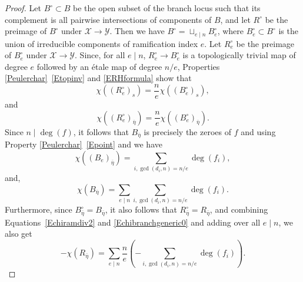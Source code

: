 \documentclass[12pt]{amsart}
\numberwithin{equation}{section}
\theoremstyle{definition}
\newcommand{\padma}[1]{{\color{Magenta} \sf $\clubsuit\clubsuit\clubsuit$ Padma: [#1]}}
\newcommand{\mc}[1]{\mathcal{#1}}
\begin{document}
\begin{proof}
 Let $B^\circ \subset B$ be the open subset of the branch locus such
 that its complement is all pairwise intersections of components of
 $B$, and let $R^\circ$ be the preimage of $B^\circ$ under $\mc{X}
 \rightarrow \mc{Y}$. Then we have $B^\circ = \sqcup_{e \mid n}
 B^\circ_e$, where $B^\circ_e \subset B^\circ$ is the union of
 irreducible components of ramification index $e$. Let $R^\circ_e$ be
 the preimage of $B^\circ_e$ under $\mc{X} \rightarrow \mc{Y}$.
 Since, for all $e \mid n$,
 $R^{\circ}_e \to B^{\circ}_e$ is a topologically trivial map of
 degree $e$ followed by an \'{e}tale map of degree $n/e$, Properties \ref{Peulerchar}~\ref{Etopinv} and
 \ref{ERHformula} show that
 \begin{equation}\label{Echiramdiv1}
  \chi((R^\circ_e)_s) = \frac{n}{e} \chi((B^\circ_e)_s), \end{equation} and
  \begin{equation}\label{Echiramdiv2} \chi((R^\circ_e)_{\overline{\eta}}) = \frac{n}{e} \chi((B^\circ_e)_{\overline{\eta}}).
 \end{equation}
Since $n \mid \deg(f)$, it follows that $B_{\overline{\eta}}$ is
precisely the zeroes of $f$ and using Property
\ref{Peulerchar}~\ref{Epoint} and  we have 
\begin{equation}\label{Echibranchgeneric0}  
\chi((B_e)_{\overline{\eta}}) = \sum_{i,\gcd(d_i,n) = n/e} \deg(f_i), \end{equation} and, 
\begin{equation}\label{Echibranchgeneric}  
\chi(B_{\overline{\eta}}) = \sum_{e \mid n} \sum_{i,\gcd(d_i,n) = n/e} \deg(f_i). \end{equation}
Furthermore, since $B^\circ_{\overline{\eta}} = B_{\overline{\eta}}$, it also follows that $R^\circ_{\overline{\eta}} = R_{\overline{\eta}}$, and combining Equations~\eqref{Echiramdiv2} and \eqref{Echibranchgeneric0} and adding over all $e \mid n$, we also get
\begin{equation}\label{Echiramdiv3}
 -\chi(R_{\overline{\eta}}) = \sum_{e \mid n} \frac{n}{e}\left(-\sum_{i,\gcd(d_i,n) = n/e} \deg(f_i) \right).
\end{equation}


\end{proof}
\end{document}
